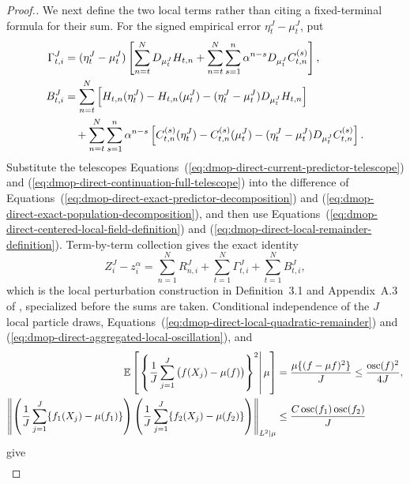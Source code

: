 \documentclass[11pt]{article}
\theoremstyle{thmstylethree}%
\begin{document}
\begin{proof}[Proof.]
We next define the two local terms rather than citing a fixed-terminal
formula for their sum.  For the signed empirical error
$\eta_t^J-\mu_t^J$, put
\begin{align}
\Gamma_{t,i}^J
&=(\eta_t^J-\mu_t^J)
\left[
\sum_{n=t}^{N}D_{\mu_t^J}H_{t,n}
+\sum_{n=t}^{N}\sum_{s=1}^{n}
\alpha^{n-s}D_{\mu_t^J}C_{t,n}^{(s)}
\right],
\label{eq:dmop-direct-centered-local-field-definition}
\\
B_{t,i}^J
&=
\sum_{n=t}^{N}
\left[
H_{t,n}(\eta_t^J)-H_{t,n}(\mu_t^J)
-(\eta_t^J-\mu_t^J)D_{\mu_t^J}H_{t,n}
\right]                                                     \notag\\
&\quad+
\sum_{n=t}^{N}\sum_{s=1}^{n}\alpha^{n-s}
\left[
C_{t,n}^{(s)}(\eta_t^J)-C_{t,n}^{(s)}(\mu_t^J)
-(\eta_t^J-\mu_t^J)D_{\mu_t^J}C_{t,n}^{(s)}
\right].
\label{eq:dmop-direct-local-remainder-definition}
\end{align}
Substitute the telescopes
Equations~(\ref{eq:dmop-direct-current-predictor-telescope}) and
(\ref{eq:dmop-direct-continuation-full-telescope}) into the difference
of Equations~(\ref{eq:dmop-direct-exact-predictor-decomposition}) and
(\ref{eq:dmop-direct-exact-population-decomposition}), and then use
Equations~(\ref{eq:dmop-direct-centered-local-field-definition}) and
(\ref{eq:dmop-direct-local-remainder-definition}).  Term-by-term
collection gives the exact identity
\begin{equation}
Z_i^J-z_i^\alpha
=
\sum_{n=1}^{N}R_{n,i}^J
+\sum_{t=1}^{N}\Gamma_{t,i}^J
+\sum_{t=1}^{N}B_{t,i}^J,
\label{eq:dmop-direct-local-error-decomposition}
\end{equation}
which is the local perturbation construction in Definition~3.1 and
Appendix~A.3 of \citet{delMoral11}, specialized before the sums are
taken.  Conditional independence of the $J$ local particle draws,
Equations~(\ref{eq:dmop-direct-local-quadratic-remainder}) and
(\ref{eq:dmop-direct-aggregated-local-oscillation}), and
\begin{align}
\mathbb{E}\left[
\left.
\left\{\frac1J\sum_{j=1}^J
\big(f(X_j)-\mu(f)\big)\right\}^2
\right|\mu
\right]
&=\frac{\mu\{(f-\mu f)^2\}}J
\leq\frac{\operatorname{osc}(f)^2}{4J},                   \notag\\
\left\|
\left(\frac1J\sum_{j=1}^J\{f_1(X_j)-\mu(f_1)\}\right)
\left(\frac1J\sum_{j=1}^J\{f_2(X_j)-\mu(f_2)\}\right)
\right\|_{L^2\mid\mu}
&\leq
\frac{C\operatorname{osc}(f_1)\operatorname{osc}(f_2)}J
\label{eq:dmop-direct-local-empirical-moments}
\end{align}
give
\begin{align}

\end{align}
\end{proof}
\end{document}
